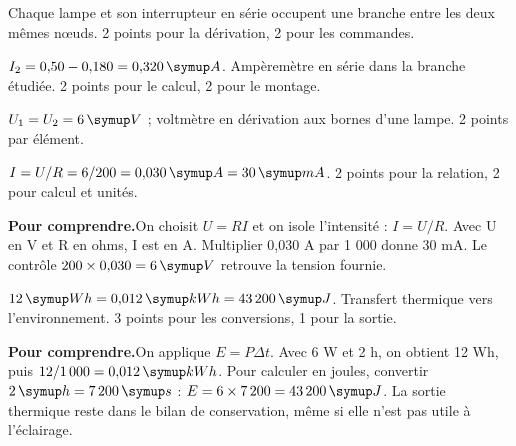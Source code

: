 \label{cor-B3}
\par\noindent\begin{minipage}{\linewidth}
Chaque lampe et son interrupteur en série occupent une branche entre les deux mêmes nœuds. 2 points pour la dérivation, 2 pour les commandes.\par
{}
\end{minipage}\par
\par\noindent\begin{minipage}{\linewidth}
$I_2=0{,}50-0{,}180=0{,}320\unite A$. Ampèremètre en série dans la branche étudiée. 2 points pour le calcul, 2 pour le montage.\par
{}
\end{minipage}\par
\par\noindent\begin{minipage}{\linewidth}
$U_1=U_2=6\unite V$ ; voltmètre en dérivation aux bornes d’une lampe. 2 points par élément.\par
{}
\end{minipage}\par
\par\noindent\begin{minipage}{\linewidth}
$I=U/R=6/200=0{,}030\unite A=30\unite{mA}$. 2 points pour la relation, 2 pour calcul et unités.\par
\smallskip\textbf{Pour comprendre.}\enspace On choisit $U=RI$ et on isole l’intensité : $I=U/R$. Avec U en V et R en ohms, I est en A. Multiplier 0,030 A par 1 000 donne 30 mA. Le contrôle $200\times0{,}030=6\unite V$ retrouve la tension fournie.\par
\end{minipage}\par
\par\noindent\begin{minipage}{\linewidth}
$12\unite{Wh}=0{,}012\unite{kWh}=43\,200\unite J$. Transfert thermique vers l’environnement. 3 points pour les conversions, 1 pour la sortie.\par
\smallskip\textbf{Pour comprendre.}\enspace On applique $E=P\Delta t$. Avec 6 W et 2 h, on obtient 12 Wh, puis $12/1\,000=0{,}012\unite{kWh}$. Pour calculer en joules, convertir $2\unite h=7\,200\unite s$ : $E=6\times7\,200=43\,200\unite J$. La sortie thermique reste dans le bilan de conservation, même si elle n’est pas utile à l’éclairage.\par
\end{minipage}\par
